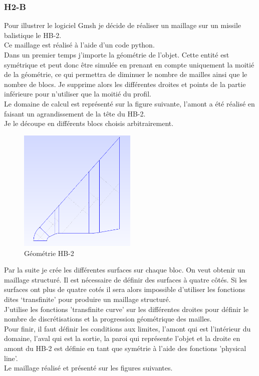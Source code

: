 \subsubsection{H2-B}

Pour illustrer le logiciel Gmsh je décide de réaliser un maillage sur un missile balistique le HB-2.\\
Ce maillage est réalisé à l'aide d'un code python.\\
Dans un premier temps j'importe la géométrie de l'objet. Cette entité est symétrique et peut donc être simulée en prenant en compte uniquement la moitié de la géométrie, ce qui permettra de diminuer le nombre de mailles ainsi que le nombre de blocs. Je supprime alors les différentes droites et points de la partie inférieure pour n'utiliser que la moitié du profil.\\
Le domaine de calcul est représenté sur la figure suivante, l'amont a été réalisé en faisant un agrandissement de la tête du HB-2.\\
Je le découpe en différents blocs choisis arbitrairement.

\begin{figure}[H]
\begin{center}
\includegraphics[width=0.5\textwidth]{chapter1_introduction/pictures/gmsh/hb2_geo.png}
\caption{Géométrie HB-2}
\end{center}
\end{figure}

Par la suite je crée les différentes surfaces sur chaque bloc. On veut obtenir un maillage structuré. Il est nécessaire de définir des surfaces à quatre côtés. Si les surfaces ont plus de quatre cotés il sera alors impossible d'utiliser les fonctions dites ‘transfinite’ pour produire un maillage structuré.\\
J'utilise les fonctions 'transfinite curve' sur les différentes droites pour définir le nombre de discrétisations et la progression géométrique des mailles.\\
Pour finir, il faut définir les conditions aux limites, l'amont qui est l'intérieur du domaine, l'aval qui est la sortie, la paroi qui représente l'objet et la droite en amont du HB-2 est définie en tant que symétrie à l'aide des fonctions 'physical line'.\\
Le maillage réalisé et présenté sur les figures suivantes.

